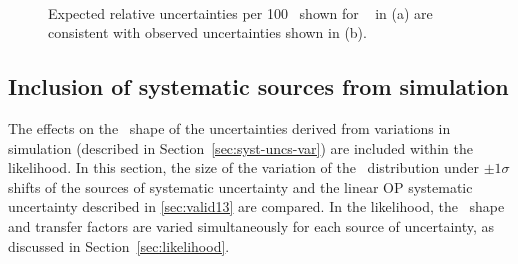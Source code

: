\begin{figure}[h!]
  \centering
  ~~
  \\
  \caption{\label{fig:expectedObservedZinv}Expected relative uncertainties per 100 \GeV~shown for \zInv~ in (a) are consistent
  with observed uncertainties shown in (b).}
\end{figure}


\newpage
\subsection{Inclusion of systematic sources from simulation}
\label{sec:mcSystStudiesShape}

The effects on the \mht~shape of the uncertainties derived from variations in simulation 
(described in Section~\ref{sec:syst-uncs-var}) are included within the likelihood.
In this section, the size of the variation of the \mht~distribution under $\pm1\sigma$ shifts of the
sources of systematic uncertainty and the linear OP systematic uncertainty
described in \ref{sec:valid13} are compared. In the likelihood, the \mht~shape and transfer factors
are varied simultaneously for each source of uncertainty, as discussed in Section~\ref{sec:likelihood}.

